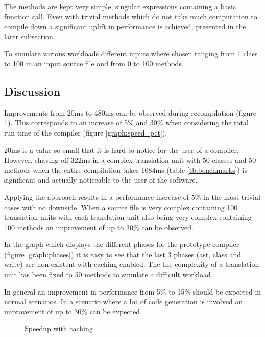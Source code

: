 \documentclass{VUMIFPSbakalaurinis}
\begin{document}
The methods are kept very simple, singular expressions containing a basic function call.
Even with trivial methods which do not take much computation to compile down a significant uplift in performance is achieved, presented in the later subsection.

To simulate various workloads different inputs where chosen ranging from 1 class to 100 in an input source file and from 0 to 100 methods.

\subsection{Discussion}

Improvements from 20ms to 480ms can be observed during recompilation (figure \ref{graph:speed}).
This corresponds to an increase of 5\% and 30\% when considering the total run time of the compiler (figure \ref{graph:speed_pct}).

20ms is a value so small that it is hard to notice for the user of a compiler.
However, shaving off 322ms in a complex translation unit with 50 classes and 50 methods when the entire compilation takes 1084ms (table \ref{tb:benchmarks}) is significant and actually noticeable to the user of the software.

Applying the approach results in a performance increase of 5\% in the most trivial cases with no downside.
When a source file is very complex containing 100 translation units with each translation unit also being very complex containing 100 methods an improvement of up to 30\% can be observed.

In the graph which displays the different phases for the prototype compiler (figure \ref{graph:phases}) it is easy to see that the last 3 phases (ast, class and write) are non existent with caching enabled.
The the complexity of a translation unit has been fixed to 50 methods to simulate a difficult workload.

In general an improvement in performance from 5\% to 15\% should be expected in normal scenarios.
In a scenario where a lot of code generation is involved an improvement of up to 30\% can be expected.


\begin{figure}
\caption{Speedup with caching}
\label{graph:speed}
\end{figure}
\end{document}
